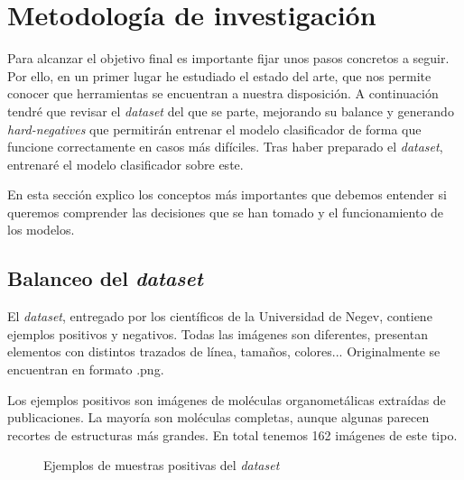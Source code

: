 \chapter{Metodología de investigación}
Para alcanzar el objetivo final es importante fijar unos pasos concretos a seguir. Por ello, en un primer lugar he estudiado el estado del arte, que nos permite conocer que herramientas se encuentran a nuestra disposición. A continuación tendré que revisar el \textit{dataset} del que se parte, mejorando su balance y generando \textit{hard-negatives} que permitirán entrenar el modelo clasificador de forma que funcione correctamente en casos más difíciles. Tras haber preparado el \textit{dataset}, entrenaré el modelo clasificador sobre este.

En esta sección explico los conceptos más importantes que debemos entender si queremos comprender las decisiones que se han tomado y el funcionamiento de los modelos.

\newpage
\section{Balanceo del \textit{dataset}}
El \textit{dataset}, entregado por los científicos de la Universidad de Negev, contiene ejemplos positivos y negativos. Todas las imágenes son diferentes, presentan elementos con distintos trazados de línea, tamaños, colores... Originalmente se encuentran en formato .png.

Los ejemplos positivos son imágenes de moléculas organometálicas extraídas de publicaciones. La mayoría son moléculas completas, aunque algunas parecen recortes de estructuras más grandes. En total tenemos 162 imágenes de este tipo.

\begin{figure}[H]
\centering
    \caption{Ejemplos de muestras positivas del \textit{dataset}} 
\end{figure}

